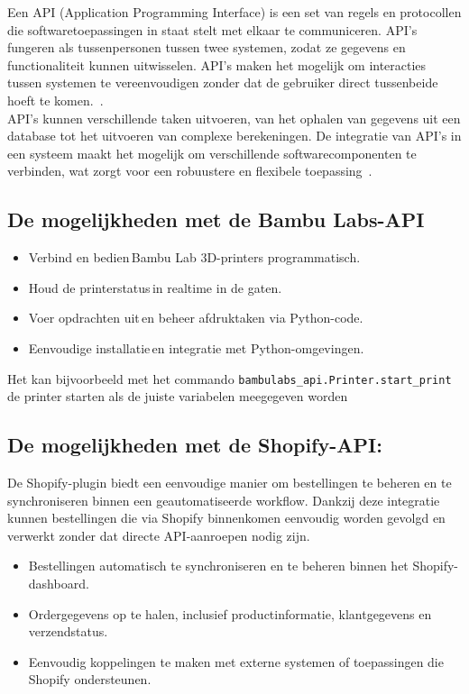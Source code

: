 Een API (Application Programming Interface) is een set van regels en protocollen die softwaretoepassingen in staat stelt met elkaar te communiceren. API’s fungeren als tussenpersonen tussen twee systemen, zodat ze gegevens en functionaliteit kunnen uitwisselen. API’s maken het mogelijk om interacties tussen systemen te vereenvoudigen zonder dat de gebruiker direct tussenbeide hoeft te komen.~\autocite{aws2024}.\\

API’s kunnen verschillende taken uitvoeren, van het ophalen van gegevens uit een database tot het uitvoeren van complexe berekeningen. De integratie van API’s in een systeem maakt het mogelijk om verschillende softwarecomponenten te verbinden, wat zorgt voor een robuustere en flexibele toepassing~\autocite{rapidapi2024}.

\newpage

\subsection{De mogelijkheden met de Bambu Labs-API}

\begin{itemize}
    \item Verbind en bedien Bambu Lab 3D-printers programmatisch. 
    \item Houd de printerstatus in realtime in de gaten. 
    \item Voer opdrachten uit en beheer afdruktaken via Python-code. 
    \item Eenvoudige installatie en integratie met Python\--omgevingen. 
\end{itemize}

Het kan bijvoorbeeld met het commando \texttt{bambulabs\_api.Printer.start\_print} de printer s\-tarten als  de juiste variabelen meegegeven worden~\autocite{bambulabsAPI}  

\subsection{De mogelijkheden met de Shopify-API:}

De Shopify-plugin biedt een eenvoudige manier om bestellingen te beheren en te synchroniseren binnen een geautomatiseerde workflow. Dankzij deze integratie kunnen bestellingen die via Shopify binnenkomen eenvoudig worden gevolgd en verwerkt zonder dat directe API-aanroepen nodig zijn.

\begin{itemize} 
    \item Bestellingen automatisch te synchroniseren en te beheren binnen het Shopify-dashboard. 
    \item Ordergegevens op te halen, inclusief productinformatie, klantgegevens en verzendstatus. 
    \item Eenvoudig koppelingen te maken met externe systemen of toepassingen die Shopify ondersteunen. 
\end{itemize}

